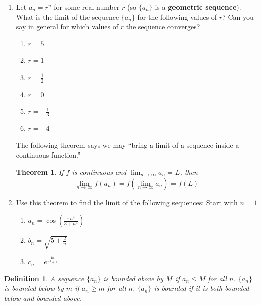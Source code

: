 \documentclass[12pt]{article}
\newtheorem*{theorem}{Theorem}
\newtheorem*{defn}{Definition}
\begin{document}
\begin{enumerate}
  \setcounter{enumi}{0}
\item Let $a_n= r^n$ for some real number $r$ (so $\{a_n\}$ is a \textbf{geometric sequence}). What is the limit of the sequence $\{a_n\}$ for the following values of $r$? Can you say in general for which values of $r$ the sequence converges?
\begin{enumerate}
\item $r=5$ \vspace{.5in}
\item $r=1$\vspace{.5in}
\item $r=\frac{1}{2}$\vspace{.5in}
\item $r=0$\vspace{.5in}
\item $r=-\frac{1}{3}$\vspace{.5in}
\item $r=-4$\vspace{.5in}
\end{enumerate}

\medskip
\noindent
The following theorem says we may ``bring a limit of a sequence inside a continuous function.''
\begin{theorem}
If $f$ is continuous and $\displaystyle\lim_{n\rightarrow\infty} a_n=L$, then
\[\displaystyle\lim_{n\rightarrow\infty} f(a_n) = f\left(\displaystyle\lim_{n\rightarrow\infty} a_n\right)=f(L)\]
\end{theorem}

\item Use this theorem to find the limit of the following sequences:
Start with $n=1$
\begin{enumerate}
\item $a_n=\cos\left(\displaystyle\frac{\pi n^4}{3+n^4}\right)$

\vspace{.5in}
\bigskip
\item $b_n=\sqrt{5+\frac{2}{n}}$
\vspace{.5in}
\bigskip
\item $c_n=e^{\frac{4n}{n^2+1}}$
\vspace{.5in}
\end{enumerate}
\end{enumerate} 
\begin{defn} \rm
A sequence $\{a_n\}$ is \emph{bounded above} by $M$ if $a_n\leq M$ for all $n$.
$\{a_n\}$ is \emph{bounded below} by $m$ if $a_n\geq m$ for all $n$.
$\{a_n\}$ is \emph{bounded} if it is both bounded below and bounded above.
\end{defn}
\end{document}
